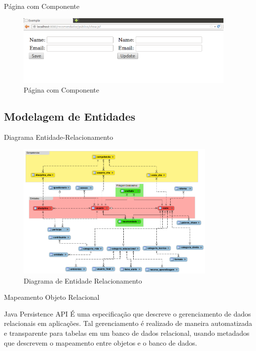 \documentclass[xcolor=dvipsnames]{beamer}
\begin{document}
\begin{frame}{Página com Componente}
	\begin{figure}[!htb]
		\centering
		\includegraphics[keepaspectratio=true,height=3.5cm]{facelets-2rec.png}
		\caption{Página com Componente}
		\label{rec-ER}
\end{figure}

		\end{frame}




\subsection{Modelagem de Entidades}
		\begin{frame}{Diagrama Entidade-Relacionamento}

\begin{figure}[!htb]
	\centering
	\includegraphics[keepaspectratio=true,height=6.7cm]{recomendador-ER.png}
	\caption{Diagrama de Entidade Relacionamento}
	\label{rec-ER}
\end{figure}

		\end{frame}

\begin{frame}{Mapeamento Objeto Relacional}
	

	\begin{block}{Java Persistence API}
É uma especificação que descreve o gerenciamento de dados relacionais em aplicações. Tal gerenciamento é realizado de maneira automatizada e transparente para tabelas em um banco de dados relacional, usando metadados que descrevem o mapeamento entre objetos e o banco de dados.	
	\end{block}		

\end{frame}	
\end{document}
